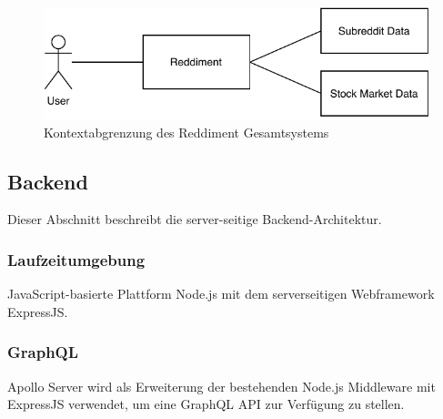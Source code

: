 \documentclass[a4paper, 10pt, conference]{IEEEtran}
\begin{document}
\begin{figure}[ht]
	\centering
	\includegraphics[width=\linewidth]{context}
	\caption{Kontextabgrenzung des Reddiment Gesamtsystems}
	\label{fig:context}
\end{figure}

\subsection{Backend} \label{sub:backend}
Dieser Abschnitt beschreibt die server-seitige Backend-Architektur.

\subsubsection{Laufzeitumgebung}

JavaScript-basierte Plattform Node.js mit dem serverseitigen Webframework ExpressJS.

\subsubsection{GraphQL}

Apollo Server wird als Erweiterung der bestehenden Node.js Middleware mit ExpressJS verwendet, um eine GraphQL API zur Verfügung zu stellen.
\end{document}
